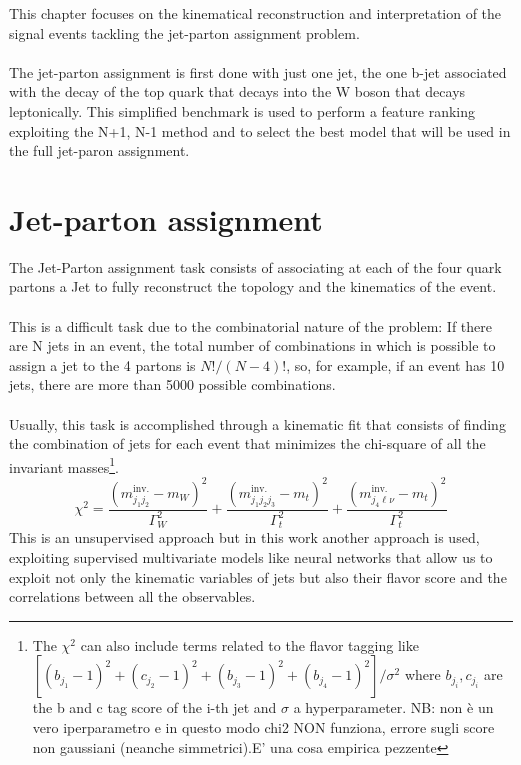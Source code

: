 \label{sec:kin}
\vspace{-1cm}
\minitoc
\vspace{0.5cm}
This chapter focuses on the kinematical reconstruction and interpretation of the signal events tackling the jet-parton assignment problem.
\\
\\
The jet-parton assignment is first done with just one jet, the one b-jet associated with the decay of the top quark that decays into the W boson that decays leptonically. This simplified benchmark is used to perform a feature ranking exploiting the N+1, N-1 method and to select the best model that will be used in the full jet-paron assignment.

\section{Jet-parton assignment}
The Jet-Parton assignment task consists of associating at each of the four quark partons a Jet to fully reconstruct the topology and the kinematics of the event.\\
\\
This is a difficult task due to the combinatorial nature of the problem: If there are N jets in an event, the total number of combinations in which is possible to assign a jet to the 4 partons is $N!/(N-4)!$, so, for example, if an event has 10 jets, there are more than 5000 possible combinations.\\
\\
Usually, this task is accomplished through a kinematic fit that consists of finding the combination of jets for each event that minimizes the chi-square of all the invariant masses\footnote{The $\chi^2$ can also include terms related to the flavor tagging like $[(b_{j_1}-1)^2+(c_{j_2}-1)^2+(b_{j_3}-1)^2+(b_{j_4}-1)^2]/\sigma^2$ where $b_{j_i},c_{j_i}$ are the b and c tag score of the i-th jet and $\sigma$ a hyperparameter. NB: non è un vero iperparametro e in questo modo chi2 NON funziona, errore sugli score non gaussiani (neanche simmetrici).E' una cosa empirica pezzente}.
\begin{equation}
    \chi^2=\frac{(m_{j_1j_2}^{\text{inv.}}-m_W)^2}{\Gamma^2_W}+\frac{(m_{j_1j_2j_3}^{\text{inv.}}-m_t)^2}{\Gamma^2_t}+\frac{(m_{j_4\ell\nu}^{\text{inv.}}-m_t)^2}{\Gamma^2_t}
\end{equation}
This is an unsupervised approach but in this work another approach is used, exploiting supervised multivariate models like neural networks that allow us to exploit not only the kinematic variables of jets but also their flavor score and the correlations between all the observables.

